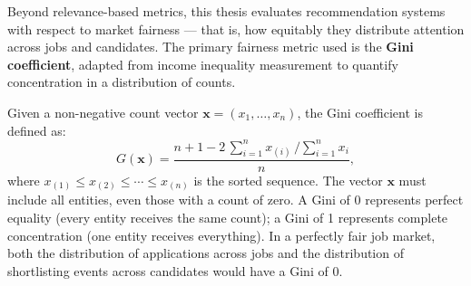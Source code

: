 Beyond relevance-based metrics, this thesis evaluates recommendation systems
with respect to market fairness — that is, how equitably they distribute
attention across jobs and candidates. The primary fairness metric used is the
\textbf{Gini coefficient}, adapted from income inequality measurement to
quantify concentration in a distribution of counts.

Given a non-negative count vector $\mathbf{x} = (x_1, \ldots, x_n)$, the Gini
coefficient is defined as:
\begin{equation}
    G(\mathbf{x}) = \frac{n + 1 - 2\,\displaystyle\sum_{i=1}^{n}
    x_{(i)}\,\big/\!\sum_{i=1}^{n} x_i}{n},
    \label{eq:gini}
\end{equation}
where $x_{(1)} \leq x_{(2)} \leq \cdots \leq x_{(n)}$ is the sorted sequence.
The vector $\mathbf{x}$ must include all entities, even those with a count of
zero. A Gini of 0 represents perfect equality (every entity receives the same
count); a Gini of 1 represents complete concentration (one entity receives
everything). In a perfectly fair job market, both the distribution of
applications across jobs and the distribution of shortlisting events across
candidates would have a Gini of 0.

